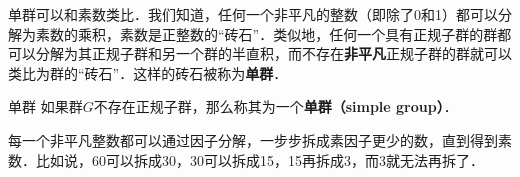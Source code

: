 

单群可以和素数类比．我们知道，任何一个非平凡的整数（即除了0和1）都可以分解为素数的乘积，素数是正整数的“砖石”．类似地，任何一个具有正规子群的群都可以分解为其正规子群和另一个群的半直积，而不存在\textbf{非平凡}正规子群的群就可以类比为群的“砖石”．这样的砖石被称为\textbf{单群}．

\begin{definition}{单群}
如果群$G$不存在正规子群，那么称其为一个\textbf{单群（simple group）}．
\end{definition}

每一个非平凡整数都可以通过因子分解，一步步拆成素因子更少的数，直到得到素数．比如说，60可以拆成30，30可以拆成15，15再拆成3，而3就无法再拆了．












